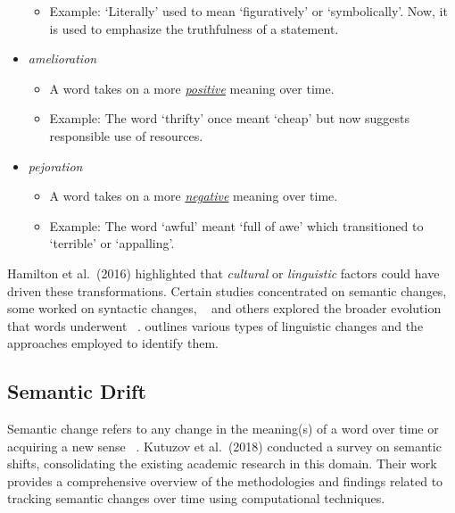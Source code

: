 \begin{itemize}
\begin{itemize}
            \item Example: `Literally' used to mean `figuratively' or `symbolically'.
            Now, it is used to emphasize the truthfulness of a statement.
        \end{itemize}
    \item \emph{amelioration}
     \begin{itemize}
            \item A word takes on a more \underline{\emph{positive}} meaning over time.
            \item Example: The word `thrifty' once meant `cheap' but now suggests responsible use of resources.
        \end{itemize}
    \item \emph{pejoration} ~\cite{10.1162/opmi_a_00081, gulordava-baroni-2011-distributional}
        \begin{itemize}
            \item A word takes on a more \underline{\emph{negative}} meaning over time.
            \item Example: The word `awful' meant `full of awe' which transitioned to `terrible' or `appalling'.
        \end{itemize}

\end{itemize}

Hamilton et al.\ (2016) highlighted that \emph{cultural} or \emph{linguistic} factors could have driven these transformations.
Certain studies concentrated on semantic changes, some worked on syntactic changes, ~\cite{kulkarni2014statisticallysignificantdetectionlinguistic, hamilton-etal-2016-cultural, 10.1162/opmi_a_00081}
and others explored the broader evolution that words underwent ~\cite{gulordava-baroni-2011-distributional, kim-etal-2014-temporal, kulkarni2014statisticallysignificantdetectionlinguistic, hamilton-etal-2016-diachronic}.
 outlines various types of linguistic changes and the approaches employed to identify them.

\subsection{Semantic Drift} \label{subsec:semantic-drift}
Semantic change refers to any change in the meaning(s) of a word over time or acquiring a new sense ~\cite{gulordava-baroni-2011-distributional, 10.1162/opmi_a_00081}.
Kutuzov et al.\ (2018) conducted a survey on semantic shifts, consolidating the existing academic research in this domain.
Their work provides a comprehensive overview of the methodologies and findings related to tracking semantic changes over time using computational techniques.

